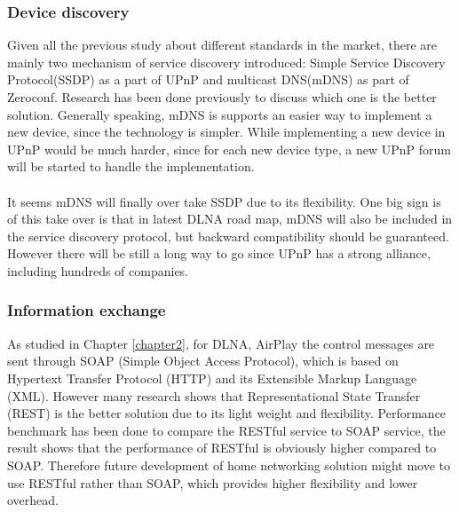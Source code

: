 \subsubsection{Device discovery}
Given all the previous study about different standards in the market, there are mainly two mechanism of service discovery introduced: Simple Service Discovery Protocol(SSDP) as a part of UPnP and multicast DNS(mDNS) as part of Zeroconf. Research \cite{zeroconf_vs_upnp} has been done previously to discuss which one is the better solution. Generally speaking, mDNS is supports an easier way to implement a new device, since the technology is simpler. While implementing a new device in UPnP would be much harder, since for each new device type, a new UPnP forum will be started to handle the implementation.\\
\\
It seems mDNS will finally over take SSDP due to its flexibility. One big sign is of this take over is that in latest DLNA road map, mDNS will also be included in the service discovery protocol, but backward compatibility should be guaranteed. However there will be still a long way to go since UPnP has a strong alliance, including hundreds of companies.
\subsubsection{Information exchange}
As studied in Chapter \ref{chapter2}, for DLNA, AirPlay the control messages are sent through SOAP (Simple Object Access Protocol), which is based on Hypertext Transfer Protocol (HTTP) and its Extensible Markup Language (XML). However many research \cite{restful_webservice} shows that Representational State Transfer (REST) is the better solution due to its light weight and flexibility. Performance benchmark \cite{performance_restful_saop} has been done to compare the RESTful service to SOAP service, the result shows that the performance of RESTful is obviously higher compared to SOAP. Therefore future development of home networking solution might move to use RESTful rather than SOAP, which provides higher flexibility and lower overhead.
